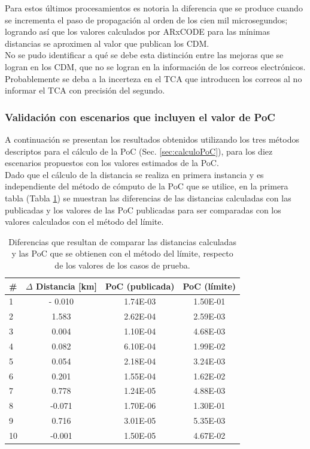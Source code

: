 Para estos \'ultimos procesamientos es notoria la diferencia que se produce cuando se incrementa el paso de propagaci\'on al orden de los cien mil microsegundos; logrando as\'i que los valores calculados por ARxCODE para las m\'inimas distancias se aproximen al valor que publican los CDM.\\

No se pudo identificar a qu\'e se debe esta distinci\'on entre las mejoras que se logran en los CDM, que no se logran en la informaci\'on de los correos electr\'onicos. Probablemente se deba a la incerteza en el TCA que introducen los correos al no informar el TCA con precisi\'on del segundo.\\

\subsubsection*{Validaci\'on con escenarios que incluyen el valor de PoC}

A continuaci\'on se presentan los resultados obtenidos utilizando los tres m\'etodos descriptos  para el c\'alculo de la PoC (Sec. \ref{sec:calculoPoC}), para los diez escenarios propuestos con los valores estimados de la PoC.\\ 

Dado que el c\'alculo de la distancia se realiza en primera instancia y es independiente del m\'etodo de c\'omputo de la PoC que se utilice, en la primera tabla (Tabla \ref{tab:distlimite}) se muestran las diferencias de las distancias calculadas con las publicadas y los valores de las PoC publicadas para ser comparadas con los valores calculados con el m\'etodo del l\'imite. 


 \begin{table}[!h]
 \caption{Diferencias que resultan de comparar las distancias calculadas\\ y las PoC que se obtienen con el m\'etodo del l\'imite, respecto\\ de los valores de los casos de prueba.}
\label{tab:distlimite}
\begin{tabular}{lccc}
 \hline \hline
 \# & $\Delta$ Distancia [km] & PoC (publicada) & PoC (l\'imite) \\
 \hline \hline
1&- 0.010&1.74E-03&1.50E-01\\
2&1.583&2.62E-04&2.59E-03\\
3&0.004&1.10E-04&4.68E-03\\
4&0.082&6.10E-04&1.99E-02\\
5&0.054&2.18E-04&3.24E-03\\
6&0.201&1.55E-04&1.62E-02\\
7&0.778&1.24E-05&4.88E-03\\
8&-0.071&1.70E-06&1.30E-01\\
9&0.716&3.01E-05&5.35E-03\\
10&-0.001&1.50E-05&4.67E-02\\
 \hline
\end{tabular} 
\end{table}


